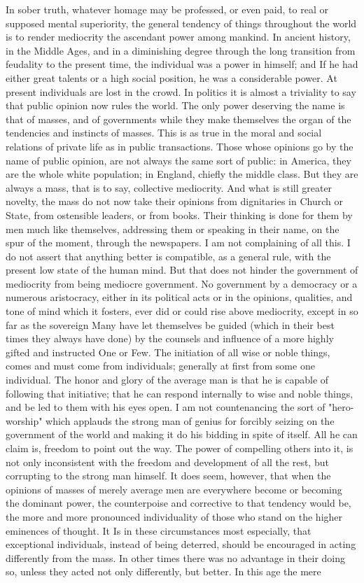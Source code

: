 \documentclass[12pt]{report}
\begin{document}
In sober truth, whatever homage may be professed, or even paid, to real or supposed mental superiority, the general tendency of things throughout the world is to render mediocrity the ascendant power among mankind. In ancient history, in the Middle Ages, and in a diminishing degree through the long transition from feudality to the present time, the individual was a power in himself; and If he had either great talents or a high social position, he was a considerable power. At present individuals are lost in the crowd. In politics it is almost a triviality to say that public opinion now rules the world. The only power deserving the name is that of masses, and of governments while they make themselves the organ of the tendencies and instincts of masses. This is as true in the moral and social relations of private life as in public transactions. Those whose opinions go by the name of public opinion, are not always the same sort of public: in America, they are the whole white population; in England, chiefly the middle class. But they are always a mass, that is to say, collective mediocrity. And what is still greater novelty, the mass do not now take their opinions from dignitaries in Church or State, from ostensible leaders, or from books. Their thinking is done for them by men much like themselves, addressing them or speaking in their name, on the spur of the moment, through the newspapers. I am not complaining of all this. I do not assert that anything better is compatible, as a general rule, with the present low state of the human mind. But that does not hinder the government of mediocrity from being mediocre government. No government by a democracy or a numerous aristocracy, either in its political acts or in the opinions, qualities, and tone of mind which it fosters, ever did or could rise above mediocrity, except in so far as the sovereign Many have let themselves be guided (which in their best times they always have done) by the counsels and influence of a more highly gifted and instructed One or Few. The initiation of all wise or noble things, comes and must come from individuals; generally at first from some one individual. The honor and glory of the average man is that he is capable of following that initiative; that he can respond internally to wise and noble things, and be led to them with his eyes open. I am not countenancing the sort of "hero-worship" which applauds the strong man of genius for forcibly seizing on the government of the world and making it do his bidding in spite of itself. All he can claim is, freedom to point out the way. The power of compelling others into it, is not only inconsistent with the freedom and development of all the rest, but corrupting to the strong man himself. It does seem, however, that when the opinions of masses of merely average men are everywhere become or becoming the dominant power, the counterpoise and corrective to that tendency would be, the more and more pronounced individuality of those who stand on the higher eminences of thought. It Is in these circumstances most especially, that exceptional individuals, instead of being deterred, should be encouraged in acting differently from the mass. In other times there was no advantage in their doing so, unless they acted not only differently, but better. In this age the mere 
\end{document}

